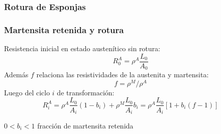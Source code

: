 \documentclass[usenames,dvipsnames]{beamer}
\begin{document}
\begin{frame}
 
 \frametitle{Rotura de Esponjas}
 
  \begin{figure}
\end{figure}
 
 
\end{frame}

 
 
 
 
 



\begin{frame}

\frametitle{Martensita retenida y rotura}

Resistencia inicial en estado austenítico sin rotura: 
\begin{equation*}
 R^A _0 = \rho^A \frac{L_0}{A_0}
\end{equation*}
Además $f$ relaciona las resistividades de la austenita y martensita:
\begin{equation*}
 f=\rho^M / \rho^A
\end{equation*}
Luego del ciclo $i$ de transformación:
\begin{equation*}
R^A _i=\rho^A \frac{L_0}{A_i}(1-b_i) + \rho^M \frac{L_0}{A_i}b_i = \rho^A \frac{L_0}{A_i} [1+ b_i (f-1)]
\end{equation*}

$0<b_i <1$ fracción de martensita retenida

\end{frame}
\end{document}
